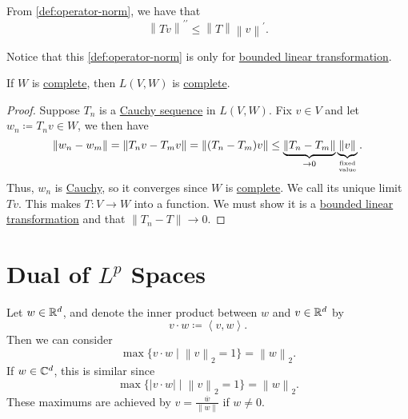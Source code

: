 \begin{prev}
	From \autoref{def:operator-norm}, we have that
	\[
		\left\lVert Tv\right\rVert ^{\prime\prime} \leq \left\lVert T\right\rVert \left\lVert v\right\rVert ^\prime .
	\]
\end{prev}

\begin{remark}
	Notice that this \autoref{def:operator-norm} is only for \hyperref[def:bounded-linear-transformation]{bounded linear transformation}.
\end{remark}

\begin{theorem}\label{thm:blts-complete}
	If \(W\) is \hyperref[def:complete]{complete}, then \(L(V,W)\) is \hyperref[def:complete]{complete}.
\end{theorem}

\begin{proof}
	Suppose \(T_n\) is a \hyperref[def:Cauchy-sequence]{Cauchy sequence} in \(L(V,W)\). Fix \(v \in V\) and let \(w_n \coloneqq T_n v \in W\), we then have
	\[
		\left\lVert w_n - w_m\right\rVert = \left\lVert T_n v - T_m v\right\rVert = \left\lVert (T_n - T_m)v\right\rVert
		\leq \underbrace{\left\lVert T_n - T_m\right\rVert}_{\to 0} \underbrace{\left\lVert v\right\rVert}_{\text{fixed}\atop \text{value}}.
	\]
	Thus, \(w_n\) is \hyperref[def:Cauchy-sequence]{Cauchy}, so it converges since \(W\) is \hyperref[def:complete]{complete}. We call its unique
	limit \(Tv\). This makes \(T \colon V \to W\) into a function. We must show it is a \hyperref[def:bounded-linear-transformation]{bounded linear transformation} and that
	\(\left\lVert T_n - T\right\rVert \to 0\).
\end{proof}

\section{Dual of \(L^p\) Spaces}
\begin{eg}
	Let \(w \in \mathbb{\MakeUppercase{r}} ^d\), and denote the inner product between \(w\) and \(v\in \mathbb{\MakeUppercase{r}} ^d\) by
	\[
		v\cdot w \coloneqq \left< v, w \right>.
	\]
	Then we can consider
	\[
		\max\{v \cdot w \mid \left\lVert v\right\rVert_2 = 1\} = \left\lVert w\right\rVert_2.
	\]
	If \(w \in \mathbb{\MakeUppercase{c}}^d\), this is similar since
	\[
		\max\{\left\vert v \cdot w \right\vert  \mid \left\lVert v\right\rVert_2 = 1\} = \left\lVert w\right\rVert_2.
	\]
	These maximums are achieved by \(v = \frac{\overline{w} }{\left\lVert w\right\rVert}\) if \(w \neq 0\).
\end{eg}

